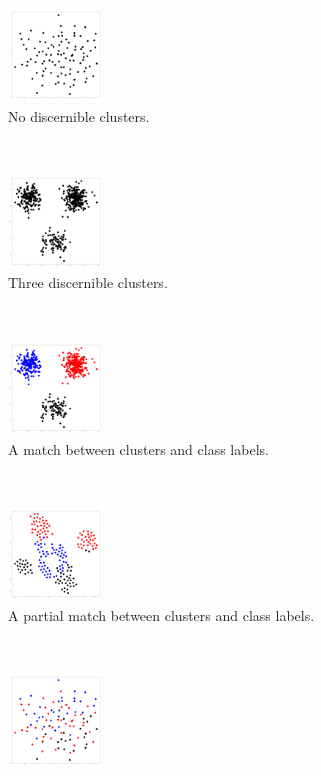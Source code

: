 
\begin{figure}
	\centering
	\begin{subfigure}[t]{0.45\textwidth}
	    \centering
        \includegraphics[height=2.5cm]{figures/blob_impl.pdf}
        \caption{No discernible clusters.}
    \end{subfigure}
    ~
    \begin{subfigure}[t]{0.45\textwidth}
	    \centering
        \includegraphics[height=2.5cm]{figures/clusters_impl.pdf}
        \caption{Three discernible clusters.}
    \end{subfigure}
    ~
    \begin{subfigure}[t]{0.45\textwidth}
	    \centering
        \includegraphics[height=2.5cm]{figures/clusters_expl.pdf}
        \caption{A match between clusters and class labels.}
    \end{subfigure}
    ~
    \begin{subfigure}[t]{0.45\textwidth}
	    \centering
        \includegraphics[height=2.5cm]{figures/clusters_expl_mismatch.pdf}
        \caption{A partial match between clusters and class labels.}
    \end{subfigure}
    ~
    \begin{subfigure}[t]{0.45\textwidth}
	    \centering
        \includegraphics[height=2.5cm]{figures/blob_expl.pdf}

\end{subfigure}
\end{figure}
